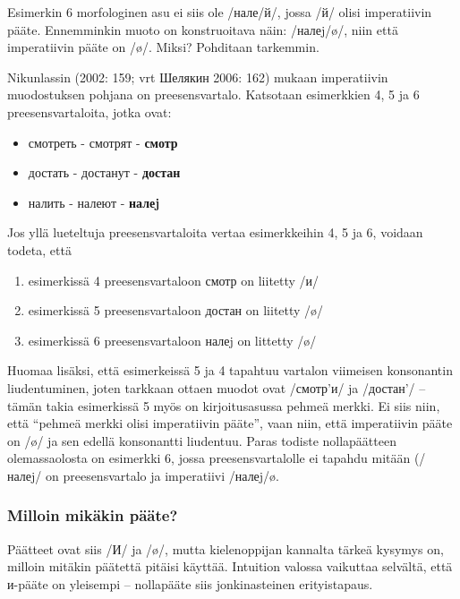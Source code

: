 \documentclass[]{scrartcl}
\providecommand{\tightlist}{%
  \setlength{\itemsep}{0pt}\setlength{\parskip}{0pt}}
\begin{document}
Esimerkin 6 morfologinen asu ei siis ole /нале/й/, jossa /й/ olisi
imperatiivin pääte. Ennemminkin muoto on konstruoitava näin: /налеj/ø/,
niin että imperatiivin pääte on /ø/. Miksi? Pohditaan tarkemmin.

Nikunlassin (2002: 159; vrt Шелякин 2006: 162) mukaan imperatiivin
muodostuksen pohjana on preesensvartalo. Katsotaan esimerkkien 4, 5 ja 6
preesensvartaloita, jotka ovat:

\begin{itemize}
\tightlist
\item
  смотреть - смотрят - \textbf{смотр}
\item
  достать - достанут - \textbf{достан}
\item
  налить - налеют - \textbf{налеj}
\end{itemize}

Jos yllä lueteltuja preesensvartaloita vertaa esimerkkeihin 4, 5 ja 6,
voidaan todeta, että

\begin{enumerate}
\def\labelenumi{\arabic{enumi}.}
\tightlist
\item
  esimerkissä 4 preesensvartaloon смотр on liitetty /и/
\item
  esimerkissä 5 preesensvartaloon достан on liitetty /ø/
\item
  esimerkissä 6 preesensvartaloon налеj on littetty /ø/
\end{enumerate}

Huomaa lisäksi, että esimerkeissä 5 ja 4 tapahtuu vartalon viimeisen
konsonantin liudentuminen, joten tarkkaan ottaen muodot ovat /смотр'и/
ja /достан'/ -- tämän takia esimerkissä 5 myös on kirjoitusasussa pehmeä
merkki. Ei siis niin, että ``pehmeä merkki olisi imperatiivin pääte'',
vaan niin, että imperatiivin pääte on /ø/ ja sen edellä konsonantti
liudentuu. Paras todiste nollapäätteen olemassaolosta on esimerkki 6,
jossa preesensvartalolle ei tapahdu mitään (/налеj/ on preesensvartalo
ja imperatiivi /налеj/ø.

\subsubsection{Milloin mikäkin
pääte?}\label{milloin-mikuxe4kin-puxe4uxe4te}

Päätteet ovat siis /И/ ja /ø/, mutta kielenoppijan kannalta tärkeä
kysymys on, milloin mitäkin päätettä pitäisi käyttää. Intuition valossa
vaikuttaa selvältä, että и-pääte on yleisempi -- nollapääte siis
jonkinasteinen erityistapaus.
\end{document}
